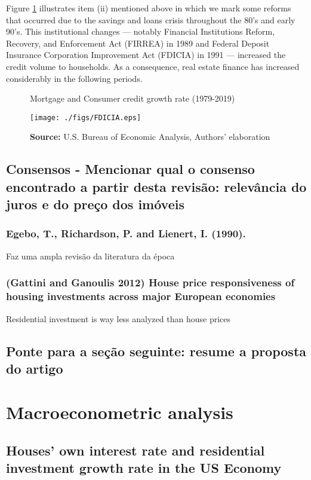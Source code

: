 \documentclass[12pt, a4paper]{article}
\begin{document}
Figure \ref{Fig:CreditFDICIA} illustrates item (ii) mentioned above in which we mark some reforms that occurred due to the savings and loans crisis throughout the 80's and early 90's.
This institutional changes --- notably Financial Institutions Reform, Recovery, and Enforcement Act (FIRREA) in 1989 and Federal Deposit Insurance Corporation Improvement Act  (FDICIA) in 1991 --- increased the credit volume to households.
As a consequence, real estate finance has increased considerably in the following periods.


\begin{figure}[htb]
	\centering
	\caption{Mortgage and Consumer credit growth rate (1979-2019)}
	\label{Fig:CreditFDICIA}
	\texttt{[image: ./figs/FDICIA.eps]}
	\caption*{\textbf{Source:} U.S. Bureau of Economic Analysis, Authors' elaboration}
\end{figure}


\subsection{Consensos - Mencionar qual o consenso encontrado a partir desta revisão: relevância do juros e do preço dos imóveis}
\label{sec:org5e3eee1}
\subsubsection{Egebo,   T.,   Richardson,   P.   and   Lienert,   I.   (1990).}
\label{sec:org79e3a7b}
Faz uma ampla revisão da literatura da época
\subsubsection{(Gattini and Ganoulis 2012) House price responsiveness of housing investments across major European economies}
\label{sec:org970e78f}
Residential investment is way less analyzed than house prices
\subsection{Ponte para a seção seguinte: resume a proposta do artigo}
\label{sec:orgbaf9ba8}

\section{Macroeconometric analysis}
\label{sec:orgff7e728}
\label{sec:VECM}
\subsection{Houses' own interest rate and residential investment growth rate in the US	Economy}
\label{sec:org6657fe8}
\label{sc:own}
\end{document}
